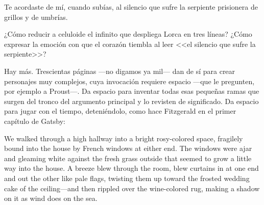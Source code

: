 Te acordaste de mí, cuando subías,
al silencio que sufre la serpiente
prisionera de grillos y de umbrías.

¿Cómo reducir a celuloide el infinito que despliega Lorca en tres líneas? ¿Cómo expresar la emoción con que el corazón tiembla al leer <<el silencio que sufre la serpiente>>? 

Hay más. Trescientas páginas ---no digamos ya mil--- dan de sí para crear personajes muy complejos, cuya invocación requiere espacio ---que le pregunten, por ejemplo a Proust---. Da espacio para inventar todas esas pequeñas ramas que surgen del tronco del argumento principal y lo revisten de significado. Da espacio para jugar con el tiempo, deteniéndolo, como hace Fitzgerald en el primer capítulo de Gatsby:

We walked through a high hallway into a bright rosy-colored space, fragilely bound into the house by French windows at either end. The windows were ajar and gleaming white against the fresh grass outside that seemed to grow a little way into the house. A breeze blew through the room, blew curtains in at one end and out the other like pale flags, twisting them up toward the frosted wedding cake of the ceiling—and then rippled over the wine-colored rug, making a shadow on it as wind does on the sea.

